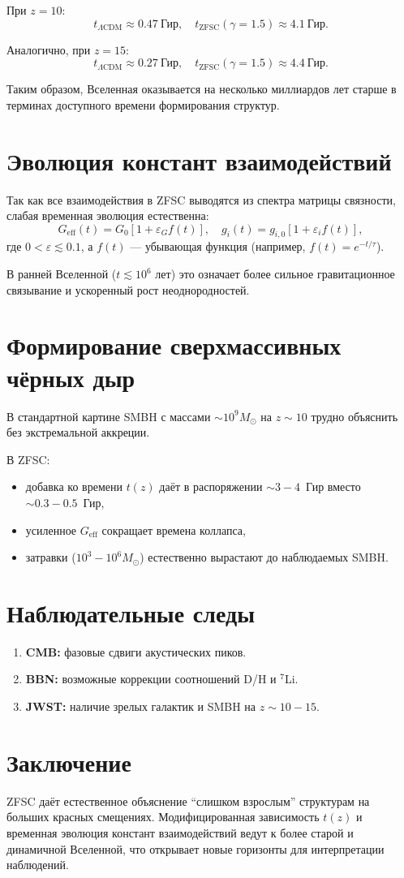 \documentclass[12pt,a4paper]{article}
\begin{document}
При $z=10$:
\[
t_{\Lambda\text{CDM}} \approx 0.47~\text{Гир}, \quad 
t_{\text{ZFSC}}(\gamma=1.5) \approx 4.1~\text{Гир}.
\]

Аналогично, при $z=15$:
\[
t_{\Lambda\text{CDM}} \approx 0.27~\text{Гир}, \quad 
t_{\text{ZFSC}}(\gamma=1.5) \approx 4.4~\text{Гир}.
\]

Таким образом, Вселенная оказывается на несколько миллиардов лет старше в терминах доступного времени формирования структур.

\section{Эволюция констант взаимодействий}
Так как все взаимодействия в ZFSC выводятся из спектра матрицы связности, слабая временная эволюция естественна:
\[
G_{\text{eff}}(t) = G_0 \left[1 + \varepsilon_G f(t)\right], \quad 
g_i(t) = g_{i,0} \left[1 + \varepsilon_i f(t)\right],
\]
где $0<\varepsilon\lesssim 0.1$, а $f(t)$ — убывающая функция (например, $f(t)=e^{-t/\tau}$). 

В ранней Вселенной ($t \lesssim 10^6$ лет) это означает более сильное гравитационное связывание и ускоренный рост неоднородностей.

\section{Формирование сверхмассивных чёрных дыр}
В стандартной картине SMBH с массами $\sim 10^9 M_\odot$ на $z\sim 10$ трудно объяснить без экстремальной аккреции. 

В ZFSC:
\begin{itemize}
  \item добавка ко времени $t(z)$ даёт в распоряжении $\sim 3-4$~Гир вместо $\sim 0.3-0.5$~Гир,
  \item усиленное $G_{\text{eff}}$ сокращает времена коллапса,
  \item затравки ($10^3-10^6 M_\odot$) естественно вырастают до наблюдаемых SMBH.
\end{itemize}

\section{Наблюдательные следы}
\begin{enumerate}
  \item \textbf{CMB:} фазовые сдвиги акустических пиков.
  \item \textbf{BBN:} возможные коррекции соотношений D/H и $^7$Li.
  \item \textbf{JWST:} наличие зрелых галактик и SMBH на $z\sim 10-15$.
\end{enumerate}

\section{Заключение}
ZFSC даёт естественное объяснение ``слишком взрослым'' структурам на больших красных смещениях. Модифицированная зависимость $t(z)$ и временная эволюция констант взаимодействий ведут к более старой и динамичной Вселенной, что открывает новые горизонты для интерпретации наблюдений.
\end{document}
